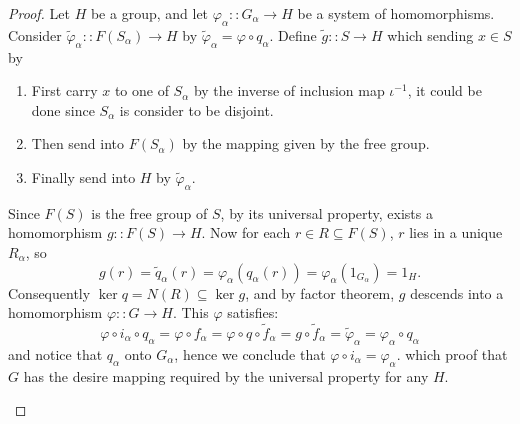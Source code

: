 \documentclass[a4paper,titlepage]{article}
\theoremstyle{remark}
\theoremstyle{definition}
\theoremstyle{definition}
\theoremstyle{plain}
\begin{document}
\begin{proof}
    Let $H$ be a group, and let $\varphi_\alpha :: G_\alpha \to H$ be a system of homomorphisms.
    Consider $\tilde{\varphi}_\alpha :: F(S_\alpha) \to H$ by $\tilde{\varphi}_\alpha = \varphi \circ q_\alpha$.
    Define $\tilde{g} :: S \to H$ which sending $x \in S$ by
    \begin{enumerate}
      \item First carry $x$ to one of $S_\alpha$ by the inverse of inclusion map $\iota^{-1}$, 
        it could be done since $S_\alpha$ is consider to be disjoint.
      \item Then send into $F(S_\alpha)$ by the mapping given by the free group.
      \item Finally send into $H$ by $\tilde{\varphi}_\alpha$.
    \end{enumerate}
    Since $F(S)$ is the free group of $S$, by its universal property, exists a homomorphism $g :: F(S) \to H$.
    Now for each $r \in R \subseteq F(S)$, $r$ lies in a unique $R_\alpha$, so
    \[ g(r) = \tilde{q}_\alpha(r) = \varphi_\alpha(q_\alpha(r)) = \varphi_\alpha(1_{G_\alpha}) = 1_H. \]
    Consequently $\ker q = N(R) \subseteq \ker g$, and by factor theorem, $g$ descends into a
    homomorphism $\varphi :: G \to H$. This $\varphi$ satisfies:
    \[
      \varphi \circ i_\alpha \circ q_\alpha = \varphi \circ f_\alpha
      = \varphi \circ q \circ \tilde{f}_\alpha
      = g \circ \tilde{f}_\alpha
      = \tilde{\varphi}_\alpha
      = \varphi_\alpha \circ q_\alpha
    \]
    and notice that $q_\alpha$ onto $G_\alpha$, hence we conclude that $\varphi \circ i_\alpha = \varphi_\alpha$.
    which proof that $G$ has the desire mapping required by the universal property for any $H$.
    \begin{figure}[h]
      \centering
\end{figure}
\end{proof}
\end{document}
